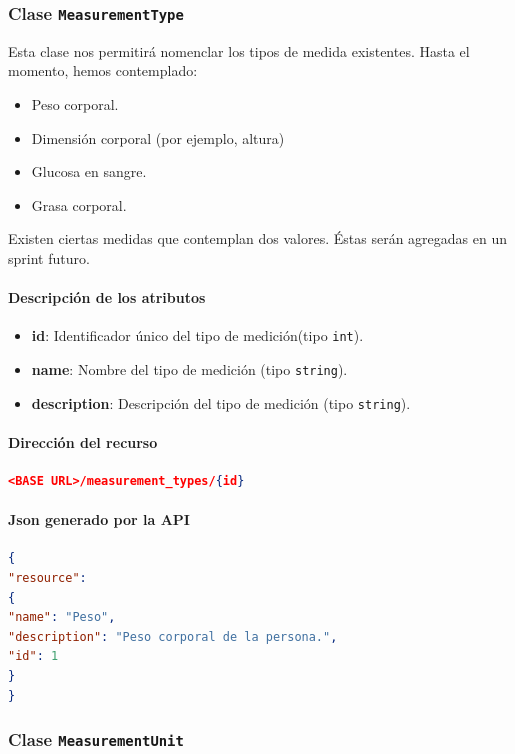 \subsubsection{Clase \texttt{MeasurementType}}

Esta clase nos permitirá nomenclar los tipos de medida existentes.
Hasta el momento, hemos contemplado:
\begin{itemize}
	\item Peso corporal.
	\item Dimensión corporal (por ejemplo, altura)
	\item Glucosa en sangre.
	\item Grasa corporal.
\end{itemize}
Existen ciertas medidas que contemplan dos valores.
Éstas serán agregadas en un sprint futuro.

\paragraph{Descripción de los atributos}
\begin{itemize}
	\item \textbf{id}: Identificador único del tipo de medición(tipo \texttt{int}).
	\item \textbf{name}: Nombre del tipo de medición (tipo \texttt{string}).
	\item \textbf{description}: Descripción del tipo de medición (tipo \texttt{string}).
\end{itemize}

\paragraph{Dirección del recurso}
\begin{lstlisting}[language=json,firstnumber=1]
<BASE URL>/measurement_types/{id}
\end{lstlisting}

\paragraph{Json generado por la API} 
\begin{lstlisting}[language=json,firstnumber=1]
{
"resource": 
{
"name": "Peso",
"description": "Peso corporal de la persona.",
"id": 1
}
}
\end{lstlisting}

\subsubsection{Clase \texttt{MeasurementUnit}}

